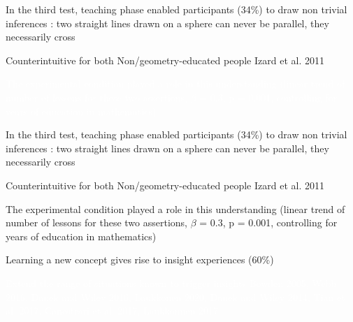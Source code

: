 \documentclass[11pt]{beamer}
\begin{document}
                    \begin{frame}
                      In the third test, teaching phase enabled participants (34\%) to draw non trivial inferences : \textcolor{bittersweet}{two straight lines drawn on a sphere can never be parallel, they necessarily cross}

                      Counterintuitive for both Non/geometry-educated people  \footnotesize{Izard et al. 2011}

                      \normalsize

                     \textcolor{white}{The experimental condition played a role in this understanding (linear trend of number of lessons for these two assertions, $\beta$ = 0.3, p = 0.001, controlling for years of education in mathematics)}


                    \end{frame}

                    \begin{frame}
                      In the third test, teaching phase enabled participants (34\%) to draw non trivial inferences : \textcolor{bittersweet}{two straight lines drawn on a sphere can never be parallel, they necessarily cross}

                      Counterintuitive for both Non/geometry-educated people \footnotesize{Izard et al. 2011}

                      \normalsize

                      The experimental condition played a role in this understanding (linear trend of number of lessons for these two assertions, $\beta$ = 0.3, p = 0.001, controlling for years of education in mathematics)


                    \end{frame}


                    
                    \begin{frame}

                      
                      Learning a new concept gives rise to insight experiences (60\%)

                      \textcolor{white}{Extend the range of situations known to trigger insights \footnotesize{Bowden 2005, Webb 2016, Danek and Wiley 2016, Laukkonen 2020, Danek and Wiley 2014, Tian et al. 2017, Canestrari et al. 2017, Laukkonnen 2017}}




                    \end{frame}
\end{document}
